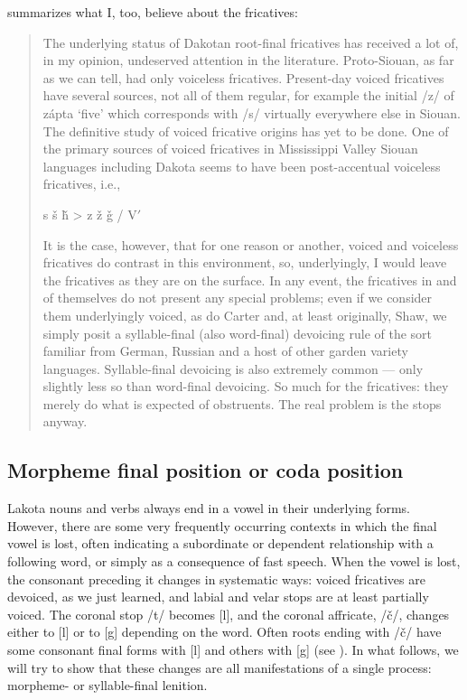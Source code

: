 \documentclass[output=paper]{LSP/langsci}
\begin{document}
\citet[4]{Rankin2001} summarizes what I, too, believe about the fricatives:

\begin{quote}The underlying status of Dakotan root-final fricatives has received a lot of, in my opinion, undeserved attention in the literature. Proto-Siouan, as far as we can tell, had only voiceless fricatives. Present-day voiced fricatives have several sources, not all of them regular, for example the initial /z/ of z\'apta `five' which corresponds with /s/ virtually everywhere else in Siouan. The definitive study of voiced fricative origins has yet to be done. One of the primary sources of voiced fricatives in Mississippi Valley Siouan languages including Dakota seems to have been post-accentual voiceless fricatives, i.e.,\vspace{-1em}
\begin{center}
s \v{s} \v{h} > z \v{z} \v{g} / V$'$  \underline{\hspace{1em}}
\end{center}
\vspace{-1em}
It is the case, however, that for one reason or another, voiced and voiceless fricatives do contrast in this environment, so, underlyingly, I would leave the fricatives as they are on the surface. In any event, the fricatives in and of themselves do not present any special problems; even if we consider them underlyingly voiced, as do Carter and, at least originally, Shaw, we simply posit a syllable-final (also word-final) devoicing rule of the sort familiar from German, Russian and a host of other garden variety languages. Syllable-final devoicing is also extremely common --- only slightly less so than word-final devoicing. So much for the fricatives: they merely do what is expected of obstruents. The real problem is the stops anyway.\end{quote}

\subsection{Morpheme final position or coda position}

Lakota nouns and verbs always end in a vowel in their underlying forms. However, there are some very frequently occurring contexts in which the final vowel is lost, often indicating a subordinate or dependent relationship with a following word, or simply as a consequence of fast speech. When the vowel is lost, the consonant preceding it changes in systematic ways: voiced fricatives are devoiced, as we just learned, and labial and velar stops are at least partially voiced. The coronal stop /t/ becomes [l], and the coronal affricate, /\v{c}/, changes either to [l] or to [g] depending on the word. Often roots ending with /\v{c}/ have some consonant final forms with [l] and others with [g] (see ). In what follows, we will try to show that these changes are all manifestations of a single process: morpheme- or syllable-final lenition.
\end{document}

